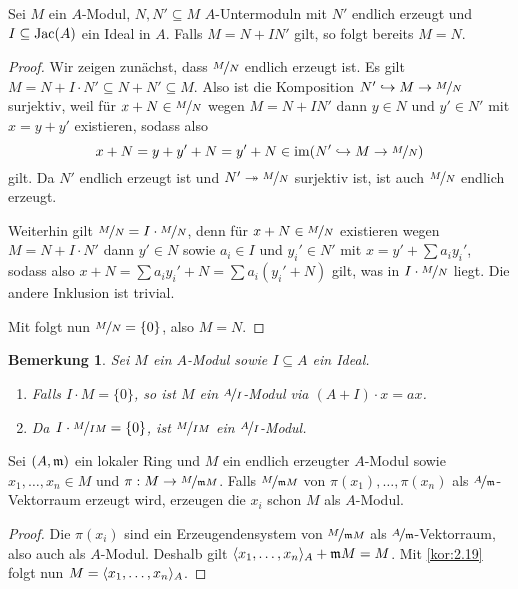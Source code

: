 \documentclass[12pt,a4paper]{scrartcl}
\theoremstyle{cplain}
\theoremstyle{cdef}
\newtheorem{beme}[thmcounter]{Bemerkung}
\begin{document}
\begin{kor} \label{kor:2.19}
	Sei $M$ ein $A$-Modul, $N,N' \subseteq M$ $A$-Untermoduln mit $N'$ endlich erzeugt und $I\subseteq \operatorname{Jac}(A)$ ein Ideal in $A$. Falls $M=N + IN'$ gilt, so folgt bereits $M=N$.
\end{kor}
\begin{proof}
	Wir zeigen zunächst, dass $\nicefrac{M}{N}$ endlich erzeugt ist. Es gilt $M=N+ I \cdot N' \subseteq N+ N' \subseteq M$. Also ist die Komposition $N' \hookrightarrow M \to \nicefrac{M}{N}$ surjektiv, weil für $x+ N \in \nicefrac{M}{N}$ wegen $M=N+IN'$ dann $y\in N$ und $y' \in N'$ mit $x=y+y'$ existieren, sodass also \[x+N=y+y'+N = y' + N \in \operatorname{im}(N' \hookrightarrow M \to \nicefrac{M}{N}) \] gilt. Da $N'$ endlich erzeugt ist und $N' \twoheadrightarrow \nicefrac{M}{N}$ surjektiv ist, ist auch $\nicefrac{M}{N}$ endlich erzeugt.
	
	Weiterhin gilt $\nicefrac{M}{N} = I \cdot \nicefrac{M}{N}$, denn für $x+N \in \nicefrac{M}{N}$ existieren wegen $M=N+ I\cdot N'$ dann $y' \in N$ sowie $a_i \in I$ und $y_i' \in N'$ mit $x= y' + \sum a_iy_i'$, sodass also $x+ N = \sum a_iy_i' + N = \sum a_i(y_i' + N) $ gilt, was in $I \cdot \nicefrac{M}{N}$ liegt. Die andere Inklusion ist trivial.
	
	Mit  folgt nun $\nicefrac{M}{N} = \{0\}$, also $M=N$.
\end{proof}
\begin{beme}
	Sei $M$ ein $A$-Modul sowie $I \subseteq A$ ein Ideal.
	\begin{enumerate}
		\item Falls $I \cdot M = \{0\}$, so ist $M$ ein $\nicefrac{A}{I}$-Modul via $(A+I) \cdot x = ax$.
		\item Da $I \cdot \nicefrac{M}{I M} = \{0\}$, ist $\nicefrac{M}{IM}$ ein $\nicefrac{A}{I}$-Modul.
	\end{enumerate}
\end{beme}
\begin{kor}
	Sei $(A,\mathfrak{m})$ ein lokaler Ring und $M$ ein endlich erzeugter $A$-Modul sowie $x_1,\ldots,x_n \in M$ und $\pi: M \to \nicefrac{M}{\mathfrak{m} M}$. Falls $\nicefrac{M}{\mathfrak{m} M}$ von $\pi(x_1),\ldots,\pi(x_n)$ als $\nicefrac{A}{\mathfrak{m}}$-Vektorraum erzeugt wird, erzeugen die $x_i$ schon $M$ als $A$-Modul.
\end{kor}
\begin{proof}
	Die $\pi(x_i)$ sind ein Erzeugendensystem von $\nicefrac{M}{\mathfrak{m} M}$ als $\nicefrac{A}{\mathfrak{m}}$-Vektorraum, also auch als $A$-Modul. Deshalb gilt $\langle x_1,\ldots,x_n\rangle_A + \mathfrak{m} M = M$. Mit \cref{kor:2.19} folgt nun $M= \langle x_1,\ldots,x_n\rangle_A$.
\end{proof}
\end{document}
